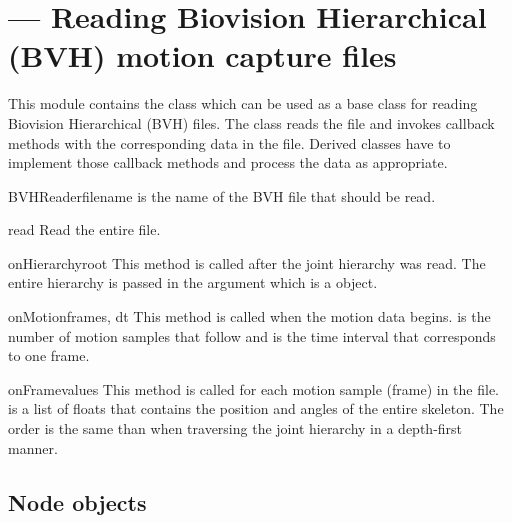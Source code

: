 \section{ ---
        Reading Biovision Hierarchical (BVH) motion capture files}


This module contains the  class which can be used as a base
class for reading Biovision Hierarchical (BVH) files. The class reads the
file and invokes callback methods with the corresponding data in the file.
Derived classes have to implement those callback methods and process
the data as appropriate.

\begin{classdesc}{BVHReader}{filename}
   is the name of the BVH file that should be read.
\end{classdesc}

\begin{methoddesc}{read}{}
Read the entire file.
\end{methoddesc}

\begin{methoddesc}{onHierarchy}{root}
This method is called after the joint hierarchy was read. The entire 
hierarchy is passed in the argument  which is a 
object.
\end{methoddesc}

\begin{methoddesc}{onMotion}{frames, dt}
This method is called when the motion data begins.  is the
number of motion samples that follow and  is the time interval
that corresponds to one frame.
\end{methoddesc}

\begin{methoddesc}{onFrame}{values}
This method is called for each motion sample (frame) in the
file.  is a list of floats that contains the position and
angles of the entire skeleton. The order is the same than when
traversing the joint hierarchy in a depth-first manner.
\end{methoddesc}

\subsection{Node objects}

